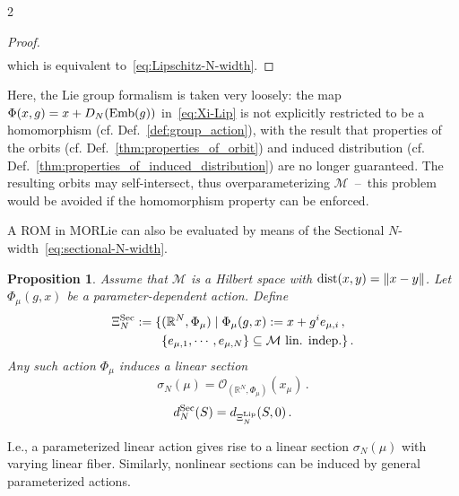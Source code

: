 \documentclass{article}
\newtheorem{proof}{Proof}[theorem]
\newtheorem{proposition}[theorem]{Proposition}
\newcommand{\M}{\mathcal{M}}                                %
\newcommand{\R}{\mathbb{R}}                                 %
\begin{document}
\begin{multicols}{2}
\begin{proof}
\begin{align}
    \end{align}
    which is equivalent to~\eqref{eq:Lipschitz-N-width}.
\end{proof}
Here, the Lie group formalism is taken very loosely: the map $\Phi(x,g) = x+D_N(\textnormal{Emb}(g))$ in~\eqref{eq:Xi-Lip} is not explicitly restricted to be a homomorphism (cf. Def.~\ref{def:group_action}), with the result that properties of the orbits (cf. Def.~\ref{thm:properties_of_orbit}) and induced distribution (cf. Def.~\ref{thm:properties_of_induced_distribution}) are no longer guaranteed. The resulting orbits may self-intersect, thus overparameterizing $\M$~--~this problem would be avoided if the homomorphism property can be enforced.

A ROM in MORLie can also be evaluated by means of the Sectional $N$-width~\eqref{eq:sectional-N-width}. 
\begin{proposition}
    Assume that $\M$ is a Hilbert space with $\textnormal{dist}(x,y) = \|x - y\|$. Let $\Phi_{\mu}(g,x)$ be a parameter-dependent action. Define  
    \begin{align}
        \Xi^{\textnormal{Sec}}_N := \{&(\R^N,\Phi_{\mu})\;|\; \Phi_{\mu}(g,x) := x + g^i e_{\mu,i}\,, \\ 
        & \{e_{\mu,1},\cdots,e_{\mu,N}\} \subseteq \M \textnormal{ lin. indep.} \}\,. \nonumber
    \end{align}
    Any such action $\Phi_{\mu}$ induces a linear section 
    \begin{equation}
        \sigma_N(\mu) = \mathcal{O}_{(\R^N, \Phi_\mu)}(x_\mu) \,.
    \end{equation} 
    \begin{equation}
        d^{\textnormal{Sec}}_N(S) = d_{\Xi^\textnormal{Lip}_N}(S,0)\,.
    \end{equation}
\end{proposition}
I.e., a parameterized linear action gives rise to a linear section $\sigma_N(\mu)$ with varying linear fiber. Similarly, nonlinear sections can be induced by general parameterized actions.


\end{multicols}
\end{document}
